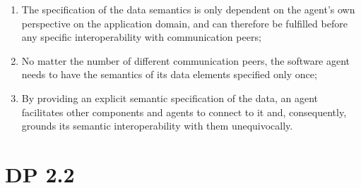 \documentclass[sort&compress,preprint,authoryear,3p,twocolumn]{elsarticle}
\begin{document}
\begin{mmdp}
\begin{enumerate}
  \item The specification of the data semantics is only dependent on the agent’s own perspective on the application domain, and can therefore be fulfilled before any specific interoperability with communication peers;
  \item No matter the number of different communication peers, the software agent needs to have the semantics of its data elements specified only once;
  \item By providing an explicit semantic specification of the data, an agent facilitates other components and agents to connect to it and, consequently, grounds its semantic interoperability with them unequivocally.
\end{enumerate}  
\end{mmdp}

\hypertarget{dp-2.2}{%
\section{DP 2.2}\label{dp-2.2}}
\end{document}
